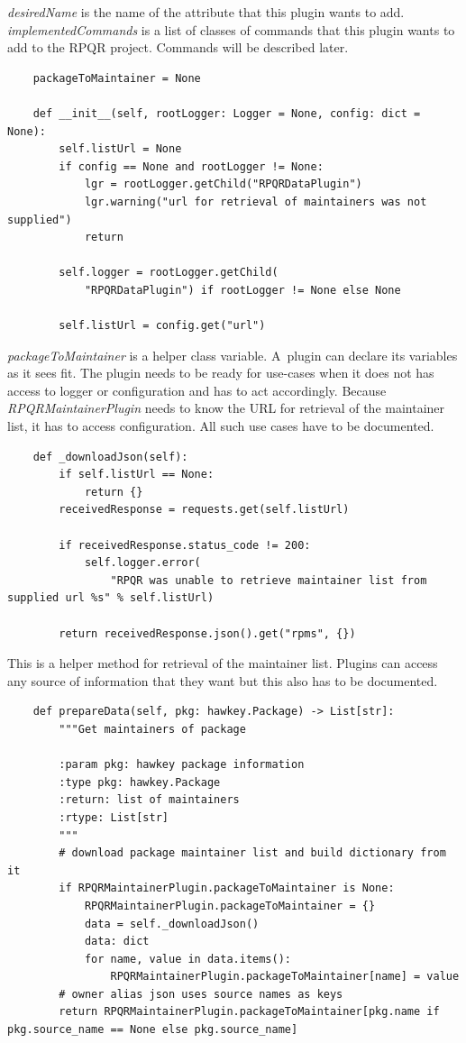 \textit{desiredName} is the name of the attribute that this plugin wants to add. \textit{implementedCommands}
is a list of classes of commands that this plugin wants to add to the RPQR project. Commands will be described
later.

\begin{lstlisting}
    packageToMaintainer = None

    def __init__(self, rootLogger: Logger = None, config: dict = None):
        self.listUrl = None
        if config == None and rootLogger != None:
            lgr = rootLogger.getChild("RPQRDataPlugin")
            lgr.warning("url for retrieval of maintainers was not supplied")
            return

        self.logger = rootLogger.getChild(
            "RPQRDataPlugin") if rootLogger != None else None

        self.listUrl = config.get("url")
\end{lstlisting}

\textit{packageToMaintainer} is a helper class variable. A~plugin can declare its variables as it sees
fit. The plugin needs to be ready for use-cases when it does not has access to logger or configuration
and has to act accordingly. Because \textit{RPQRMaintainerPlugin} needs to know the URL for retrieval
of the maintainer list, it has to access configuration. All such use cases have to be documented.

\newpage

\begin{lstlisting}
    def _downloadJson(self):
        if self.listUrl == None:
            return {}
        receivedResponse = requests.get(self.listUrl)

        if receivedResponse.status_code != 200:
            self.logger.error(
                "RPQR was unable to retrieve maintainer list from supplied url %s" % self.listUrl)

        return receivedResponse.json().get("rpms", {})
\end{lstlisting}

This is a helper method for retrieval of the maintainer list. Plugins can access any source of information
that they want but this also has to be documented.

\begin{lstlisting}
    def prepareData(self, pkg: hawkey.Package) -> List[str]:
        """Get maintainers of package

        :param pkg: hawkey package information
        :type pkg: hawkey.Package
        :return: list of maintainers
        :rtype: List[str]
        """
        # download package maintainer list and build dictionary from it
        if RPQRMaintainerPlugin.packageToMaintainer is None:
            RPQRMaintainerPlugin.packageToMaintainer = {}
            data = self._downloadJson()
            data: dict
            for name, value in data.items():
                RPQRMaintainerPlugin.packageToMaintainer[name] = value
        # owner alias json uses source names as keys
        return RPQRMaintainerPlugin.packageToMaintainer[pkg.name if pkg.source_name == None else pkg.source_name]
\end{lstlisting}

